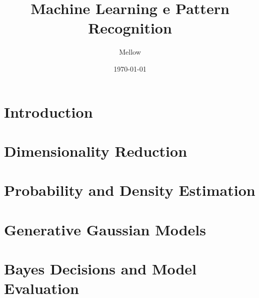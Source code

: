 \documentclass[a4paper,12pt]{article}
\title{Machine Learning e Pattern Recognition}
\author{Mellow}
\date{\today}
\begin{document}
\setlength{\parindent}{0pt}  %
\setlength{\parskip}{0.7em}  %

\maketitle

\tableofcontents

\newpage


\section{Introduction}


\newpage

\section{Dimensionality Reduction}


\newpage

\section{Probability and Density Estimation}


\newpage

\section{Generative Gaussian Models}


\newpage

%


\section{Bayes Decisions and Model Evaluation}

\end{document}
